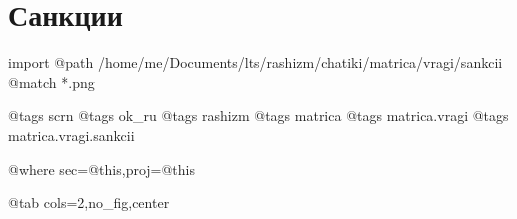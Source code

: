  
 
 
 
 

\section{Санкции}

\ifcmt
  import
    @path /home/me/Documents/lts/rashizm/chatiki/matrica/vragi/sankcii
    @match *.png

    @tags scrn
    @tags ok_ru
    @tags rashizm
    @tags matrica
    @tags matrica.vragi
    @tags matrica.vragi.sankcii

    @where sec=@this,proj=@this
  
    @tab cols=2,no_fig,center
\fi

